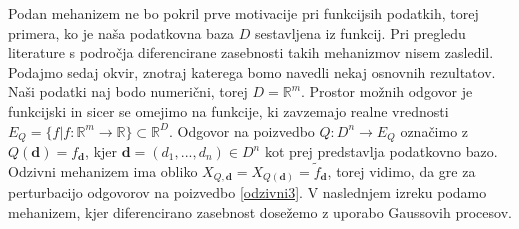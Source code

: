 \documentclass[12pt,a4paper]{amsart}
\theoremstyle{definition} %
\theoremstyle{plain} %
\begin{document}
Podan mehanizem ne bo pokril prve motivacije pri funkcijsih podatkih, torej primera, ko je naša podatkovna baza $D$ sestavljena iz funkcij. Pri pregledu literature s področja diferencirane zasebnosti takih mehanizmov nisem zasledil.
\newline
\newline
Podajmo sedaj okvir, znotraj katerega bomo navedli nekaj osnovnih rezultatov. Naši podatki naj bodo numerični, torej $D=\mathbb{R}^m$. Prostor možnih odgovor je funkcijski in sicer se omejimo na funkcije, ki zavzemajo realne vrednosti $E_Q = \{f | f : \mathbb{R}^m \rightarrow \mathbb{R}\} \subset \mathbb{R}^D$. Odgovor na poizvedbo $Q: D^n \rightarrow E_Q$ označimo z $Q(\textbf{d})=f_{\textbf{d}}$, kjer $\textbf{d} = (d_1,...,d_n) \in D^n$ kot prej predstavlja podatkovno bazo. Odzivni mehanizem ima obliko $X_{Q,\textbf{d}} = X_{Q(\textbf{d})} = \widetilde{f}_{\textbf{d}} $, torej vidimo, da gre za perturbacijo odgovorov na poizvedbo \eqref{odzivni3}. V naslednjem izreku podamo mehanizem, kjer diferencirano zasebnost dosežemo z uporabo Gaussovih procesov.
\end{document}
